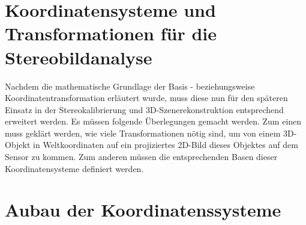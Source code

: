 	
\section{Koordinatensysteme und Transformationen für die Stereobildanalyse}
	
Nachdem die mathematische Grundlage der Basis - beziehungsweise Koordinatentransformation erläutert wurde, muss diese nun für den späteren Einsatz in der Stereokalibrierung und 3D-Szenerekonstruktion entsprechend erweitert werden. Es müssen folgende Überlegungen gemacht werden. Zum einen muss geklärt werden, wie viele Transformationen nötig sind, um von einem 3D-Objekt in Weltkoordinaten auf ein projiziertes 2D-Bild dieses Objektes auf dem Sensor zu kommen. Zum anderen müssen die entsprechenden Basen dieser Koordinatensysteme definiert werden.

\section{Aubau der Koordinatenssysteme}
		
